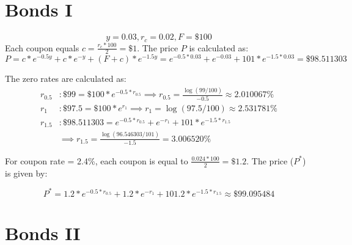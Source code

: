 \documentclass{article}
\begin{document}
\begin{table}[H]
	\begin{center}
\end{center}
\end{table}

\section{Bonds I}

$$ y=0.03, r_c = 0.02, F=\$100$$
Each coupon equals $c = \frac{r_c * 100}{2} = \$1$. The price $P$ is calculated as:
$$P = c * e^{-0.5y} + c * e^{-y} + (F+c) * e^{-1.5y} = e^{-0.5*0.03} + e^{-0.03} + 101 * e^{-1.5*0.03} = \$98.511303$$

The zero rates are calculated as:
\begin{align*}
	r_{0.5} &: \$99 = \$100*e^{-0.5*r_{0.5}} \implies r_{0.5} = \frac{\log\left(99/100\right)}{-0.5} \approx 2.010067\%\\
	r_{1} &: \$97.5 = \$100*e^{r_{1}} \implies r_{1} = \log\left(97.5/100\right) \approx 2.531781 \% \\
	r_{1.5} &: \$98.511303 = e^{-0.5 * r_{0.5}} + e^{-r_1} + 101*e^{-1.5*r_{1.5}} \\
	& \implies r_{1.5} = \frac{ \log\left( 96.546303 / 101 \right)}{-1.5} = 3.006520 \%
\end{align*}

For coupon rate = 2.4\%, each coupon is equal to $\frac{0.024 * 100}{2} = \$1.2$. The price ($P^*$) is given by:

$$P^* = 1.2 * e^{-0.5*r_{0.5}} + 1.2 * e^{-r_1} + 101.2 * e^{-1.5*r_{1.5}} \approx \$99.095484 $$


\section{Bonds II}
\end{document}
